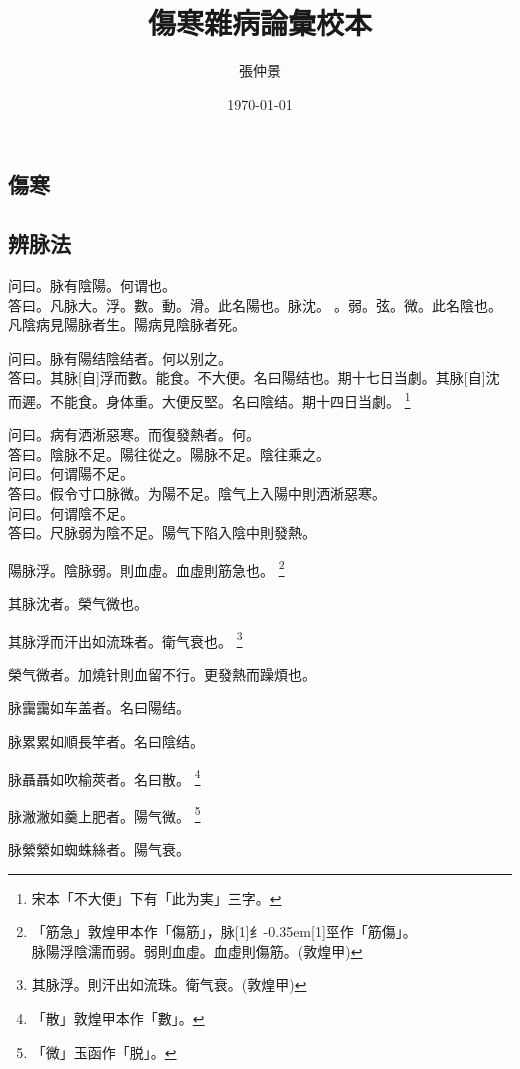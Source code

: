 \documentclass[oneside,b4paper]{ctexbook}
\title{傷寒雜病論彙校本}
\author{張仲景}
\date{\today}
\begin{document}
\maketitle
\tableofcontents
\begin{flushleft}
\part{傷寒}

\chapter{辨脉法}

问曰。脉有陰陽。何谓也。\\
答曰。凡脉大。浮。數。動。滑。此名陽也。脉沈。{𬈧}。弱。弦。微。此名陰也。凡陰病見陽脉者生。陽病見陰脉者死。

问曰。脉有陽结陰结者。何以别之。\\
答曰。其脉[自]浮而數。能食。不大便。名曰陽结也。期十七日当劇。其脉[自]沈而遲。不能食。身体重。大便反堅。名曰陰结。期十四日当劇。
\footnote{宋本「不大便」下有「此为実」三字。}

问曰。病有洒淅惡寒。而復發熱者。何。\\
答曰。陰脉不足。陽往從之。陽脉不足。陰往乘之。\\
问曰。何谓陽不足。\\
答曰。假令寸口脉微。为陽不足。陰气上入陽中則洒淅惡寒。\\
问曰。何谓陰不足。\\
答曰。尺脉弱为陰不足。陽气下陷入陰中則發熱。

陽脉浮。陰脉弱。則血虛。血虛則筋急也。
\footnote{「筋急」敦煌甲本作「傷筋」，脉{\hbox{\scalebox{0.68}[1]{纟}\kern-0.35em\scalebox{0.64}[1]{巠}}}作「筋傷」。\\脉陽浮陰濡而弱。弱則血虛。血虛則傷筋。(敦煌甲)}

其脉沈者。榮气微也。

其脉浮而汗出如流珠者。衛气衰也。
\footnote{其脉浮。則汗出如流珠。衛气衰。(敦煌甲)}

榮气微者。加燒针則血留不行。更發熱而躁煩也。

脉靄靄如车盖者。名曰陽结。

脉累累如順長竿者。名曰陰结。

脉聶聶如吹榆莢者。名曰散。
\footnote{「散」敦煌甲本作「數」。}

脉潎潎如羹上肥者。陽气微。
\footnote{「微」玉函作「脱」。}

脉縈縈如蜘蛛絲者。陽气衰。


\end{flushleft}
\end{document}
